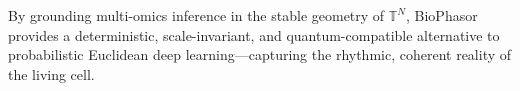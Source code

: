 \documentclass[preprint,12pt,amsmath,amssymb,superscriptaddress,floatfix]{revtex4-2}
\newcommand{\torus}{\mathbb{T}}
\begin{document}
By grounding multi-omics inference in the stable geometry of $\torus^N$,
BioPhasor provides a deterministic, scale-invariant, and quantum-compatible
alternative to probabilistic Euclidean deep learning---capturing the
rhythmic, coherent reality of the living cell.



\end{document}
